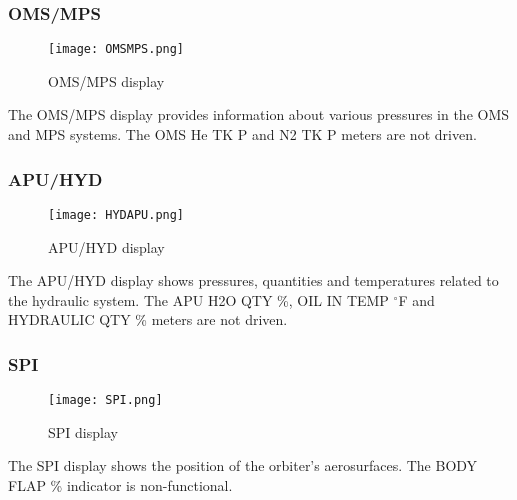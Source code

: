 \documentclass[Space_Shuttle_Ultra_Manual.tex]{subfiles}
\begin{document}
\begin{multicols*}{2}
\subsubsection{OMS/MPS}
\begin{figure}[H]
  \texttt{[image: OMSMPS.png]}
  \caption{OMS/MPS display}
  \label{fig:OMS_MPS_MEDS}
\end{figure}
The OMS/MPS display provides information about various pressures in the OMS and MPS systems. The OMS He TK P and N2 TK P meters are not driven.

\subsubsection{APU/HYD}
\begin{figure}[H]
  \texttt{[image: HYDAPU.png]}
  \caption{APU/HYD display}
  \label{fig:APU_HYD_MEDS}
\end{figure}
The APU/HYD display shows pressures, quantities and temperatures related to the hydraulic system. The APU H2O QTY \%, OIL IN TEMP $^\circ$F and HYDRAULIC QTY \% meters are not driven.

\subsubsection{SPI}
\begin{figure}[H]
  \texttt{[image: SPI.png]}
  \caption{SPI display}
  \label{fig:SPI_MEDS}
\end{figure}
The SPI display shows the position of the orbiter's aerosurfaces. The BODY FLAP \% indicator is non-functional.
\end{multicols*}
\end{document}
